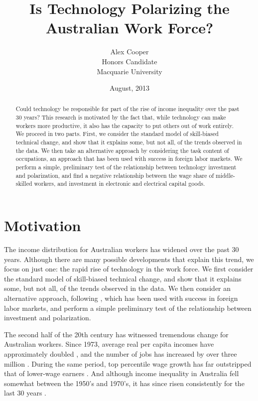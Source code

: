 \documentclass[a4paper,11pt,notitlepage]{article}
\title{Is Technology Polarizing the Australian Work Force?}
\author{Alex Cooper \\
        Honors Candidate \\
        Macquarie University}
\date{August, 2013}
\begin{document}
\vspace{6cm}

\maketitle

\vspace{3cm}

\begin{abstract}Could technology be responsible for part of the rise of income inequality over the past 30 years?
This research is motivated by the fact that, while technology can make workers more productive, it also has the capacity to put others out of work entirely. We proceed in two parts. First, we consider the standard model of skill-biased technical change, and show that it explains some, but not all, of the trends observed in the data. We then take an alternative approach by considering the task content of occupations, an approach that has been used with success in foreign labor markets. We perform a simple, preliminary test of the relationship between technology investment and polarization, and find a negative relationship between the wage share of middle-skilled workers, and investment in electronic and electrical capital goods.
\end{abstract}

\clearpage

\section{Motivation}
The income distribution for Australian workers has widened over the past 30 years. Although there are many possible developments that explain this trend, we focus on just one: the rapid rise of technology in the work force. We first consider the standard model of skill-biased technical change, and show that it explains some, but not all, of the trends observed in the data. We then consider an alternative approach, following \citet{Levy2003}, which has been used with success in foreign labor markets, and perform a simple preliminary test of the relationship between investment and polarization.

The second half of the 20th century has witnessed tremendous change for Australian workers. Since 1973, average real per capita incomes have approximately doubled \citep{NA20124}, and the number of jobs has increased by over three million \citep{LFSApr2013}. During the same period, top percentile wage growth has far outstripped that of lower-wage earners \citep{Atkinson1997,Borland1999}. And although income inequality in Australia fell somewhat between the 1950's and 1970's, it has since risen consistently for the last 30 years \citep{Leigh2005,Gaston2009}.
\end{document}
